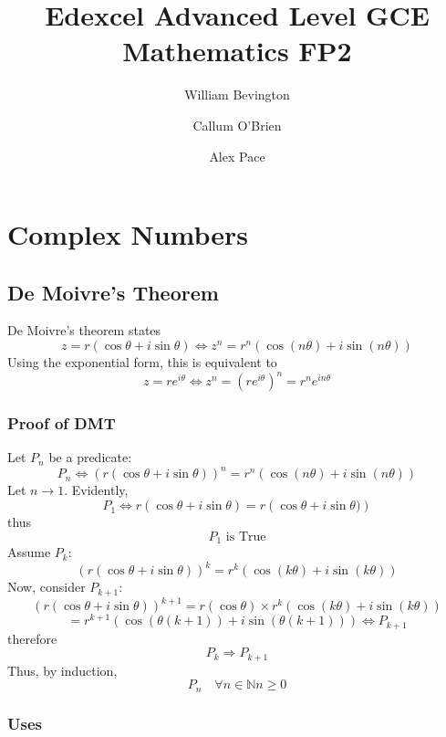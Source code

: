 \documentclass{article}
\title{Edexcel Advanced Level GCE Mathematics FP2}
\author{William Bevington \and Callum O'Brien \and Alex Pace}
\date{}
\begin{document}
\maketitle
\tableofcontents
\newpage

\section{Complex Numbers}

\subsection{De Moivre's Theorem}

De Moivre's theorem states \[z = r \left( \cos \theta + i \sin \theta \right)
\Leftrightarrow z^n = r^n \left( \cos \left( n \theta \right) + i \sin \left( n
\theta \right) \right)\] Using the exponential form, this is equivalent to \[z =
    r e^{i \theta} \Leftrightarrow z^n = \left( r e^{i \theta} \right)^n = r^n
e^{i n \theta}\]

\subsubsection{Proof of DMT}

Let $P_n$ be a predicate:\[P_n \Leftrightarrow \left( r \left( \cos \theta + i
\sin \theta \right) \right)^n = r^n \left( \cos \left( n \theta \right) + i \sin
\left( n \theta \right) \right)\] Let $n \rightarrow 1$. Evidently, \[P_1
    \Leftrightarrow r \left( \cos \theta + i \sin \theta \right) = r \left( \cos
\theta + i \sin \theta) \right)\] thus \[P_1 \text{ is True}\] Assume $P_k$:
\[\left( r \left( \cos \theta + i \sin \theta \right) \right)^k = r^k \left(
\cos \left( k \theta \right) + i \sin \left( k \theta \right) \right)\] Now,
consider $P_{k + 1}$: \[\left( r \left( \cos \theta + i \sin \theta \right)
    \right)^{k + 1} = r \left( \cos \theta \right) \times r^k \left( \cos \left(
k \theta \right) + i \sin \left( k \theta \right) \right)\] \[= r^{k +
    1} \left( \cos \left( \theta \left( k + 1 \right) \right) + i \sin
    \left( \theta \left( k + 1 \right) \right) \right) \Leftrightarrow
P_{k + 1}\] therefore \[P_k \Rightarrow P_{k + 1}\] Thus, by induction,
\[P_n \quad \forall n \in \mathbb{N} n \geq 0\]

\subsubsection{Uses}
\end{document}
